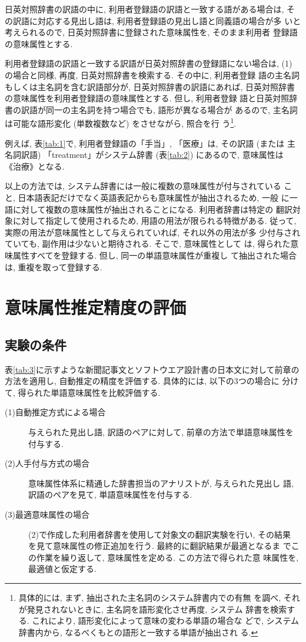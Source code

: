 日英対照辞書の訳語の中に, 利用者登録語の訳語と一致する語がある場合は, 
その訳語に対応する見出し語は, 利用者登録語の見出し語と同義語の場合が多
いと考えられるので, 日英対照辞書に登録された意味属性を, そのまま利用者
登録語の意味属性とする.  

利用者登録語の訳語と一致する訳語が日英対照辞書の登録語にない場合は, 
 (1) の場合と同様, 再度, 日英対照辞書を検索する. その中に, 利用者登録
語の主名詞もしくは主名詞を含む訳語部分が, 日英対照辞書の訳語にあれば, 
日英対照辞書の意味属性を利用者登録語の意味属性とする. 但し, 利用者登録
語と日英対照辞書の訳語が同一の主名詞を持つ場合でも, 語形が異なる場合が
あるので, 主名詞は可能な語形変化 (単数複数など) をさせながら, 照合を行
う\footnote{具体的には, まず, 抽出された主名詞のシステム辞書内での有無
を調べ, それが発見されないときに, 主名詞を語形変化させ再度, システム
辞書を検索する. これにより, 語形変化によって意味の変わる単語の場合な
どで, システム辞書内から, なるべくもとの語形と一致する単語が抽出され
る. }.  

例えば, 表\ref{tab:1}で, 利用者登録語の「手当」, 「医療」は, その訳語 (または
主名詞訳語) 「treatment」がシステム辞書 (表\ref{tab:2}) にあるので, 意味属性は
《治療》となる.  

以上の方法では, システム辞書には一般に複数の意味属性が付与されている
こと, 日本語表記だけでなく英語表記からも意味属性が抽出されるため, 一般
に一語に対して複数の意味属性が抽出されることになる. 利用者辞書は特定の
翻訳対象に対して指定して使用されるため, 用語の用法が限られる特徴がある. 
従って, 実際の用法が意味属性として与えられていれば, それ以外の用法が多
少付与されていても, 副作用は少ないと期待される. そこで, 意味属性として
は, 得られた意味属性すべてを登録する. 但し, 同一の単語意味属性が重複し
て抽出された場合は, 重複を取って登録する.  


\section{意味属性推定精度の評価}
\label{sec:4}


\subsection{実験の条件}
\label{sec:4.1}

表\ref{tab:3}に示すような新聞記事文とソフトウエア設計書の日本文に対して前章の
方法を適用し, 自動推定の精度を評価する. 具体的には, 以下の3つの場合に
分けて, 得られた単語意味属性を比較評価する.  
\begin{description}
\item[(1)自動推定方式による場合] 
与えられた見出し語, 訳語のペアに対して, 前章の方法で単語意味属性を
付与する.  
\item [(2)人手付与方式の場合]
意味属性体系に精通した辞書担当のアナリストが, 与えられた見出し
語, 訳語のペアを見て, 単語意味属性を付与する.  
\item [(3)最適意味属性の場合]
(2)で作成した利用者辞書を使用して対象文の翻訳実験を行い, その結果
を見て意味属性の修正追加を行う. 最終的に翻訳結果が最適となるま
でこの作業を繰り返して, 意味属性を定める. この方法で得られた意
味属性を, 最適値と仮定する.  
\end{description}

